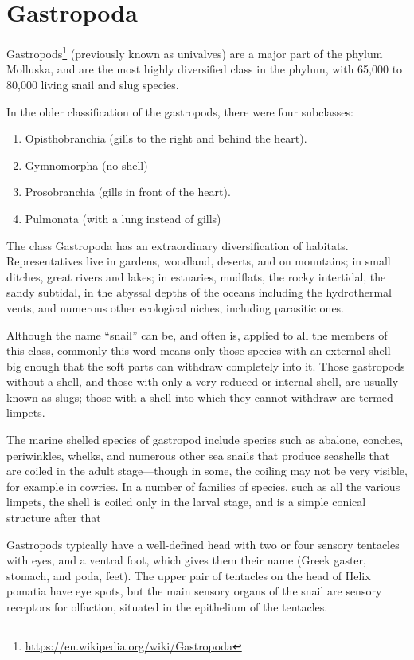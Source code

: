 \documentclass[]{book}
\providecommand{\tightlist}{%
  \setlength{\itemsep}{0pt}\setlength{\parskip}{0pt}}
\let\rmarkdownfootnote\footnote%
\def\footnote{\protect\rmarkdownfootnote}
\renewcommand{\href}[2]{#2\footnote{\url{#1}}}
\begin{document}
\hypertarget{gastropoda}{%
\section{Gastropoda}\label{gastropoda}}

\href{https://en.wikipedia.org/wiki/Gastropoda}{Gastropods} (previously known as univalves) are a major part of the phylum Molluska, and are the most highly diversified class in the phylum, with 65,000 to 80,000 living snail and slug species.

In the older classification of the gastropods, there were four subclasses:

\begin{enumerate}
\def\labelenumi{\arabic{enumi}.}
\tightlist
\item
  Opisthobranchia (gills to the right and behind the heart).
\item
  Gymnomorpha (no shell)
\item
  Prosobranchia (gills in front of the heart).
\item
  Pulmonata (with a lung instead of gills)
\end{enumerate}

The class Gastropoda has an extraordinary diversification of habitats. Representatives live in gardens, woodland, deserts, and on mountains; in small ditches, great rivers and lakes; in estuaries, mudflats, the rocky intertidal, the sandy subtidal, in the abyssal depths of the oceans including the hydrothermal vents, and numerous other ecological niches, including parasitic ones.

Although the name ``snail'' can be, and often is, applied to all the members of this class, commonly this word means only those species with an external shell big enough that the soft parts can withdraw completely into it. Those gastropods without a shell, and those with only a very reduced or internal shell, are usually known as slugs; those with a shell into which they cannot withdraw are termed limpets.

The marine shelled species of gastropod include species such as abalone, conches, periwinkles, whelks, and numerous other sea snails that produce seashells that are coiled in the adult stage---though in some, the coiling may not be very visible, for example in cowries. In a number of families of species, such as all the various limpets, the shell is coiled only in the larval stage, and is a simple conical structure after that

Gastropods typically have a well-defined head with two or four sensory tentacles with eyes, and a ventral foot, which gives them their name (Greek gaster, stomach, and poda, feet). The upper pair of tentacles on the head of Helix pomatia have eye spots, but the main sensory organs of the snail are sensory receptors for olfaction, situated in the epithelium of the tentacles.
\end{document}
